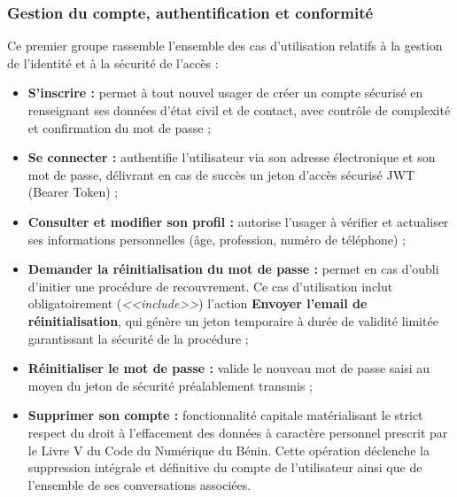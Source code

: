 \subsubsection{Gestion du compte, authentification et conformité}
Ce premier groupe rassemble l'ensemble des cas d'utilisation relatifs à la gestion de l'identité et à la sécurité de l'accès :
\begin{itemize}
    \item \textbf{S'inscrire :} permet à tout nouvel usager de créer un compte sécurisé en renseignant ses données d'état civil et de contact, avec contrôle de complexité et confirmation du mot de passe ;
    
    \item \textbf{Se connecter :} authentifie l'utilisateur via son adresse électronique et son mot de passe, délivrant en cas de succès un jeton d'accès sécurisé JWT (Bearer Token) ;
    
    \item \textbf{Consulter et modifier son profil :} autorise l'usager à vérifier et actualiser ses informations personnelles (âge, profession, numéro de téléphone) ;
    
    \item \textbf{Demander la réinitialisation du mot de passe :} permet en cas d'oubli d'initier une procédure de recouvrement. Ce cas d'utilisation inclut obligatoirement (\textit{<<include>>}) l'action \textbf{Envoyer l'email de réinitialisation}, qui génère un jeton temporaire à durée de validité limitée garantissant la sécurité de la procédure ;
    
    \item \textbf{Réinitialiser le mot de passe :} valide le nouveau mot de passe saisi au moyen du jeton de sécurité préalablement transmis ;
    
    \item \textbf{Supprimer son compte :} fonctionnalité capitale matérialisant le strict respect du droit à l'effacement des données à caractère personnel prescrit par le Livre V du Code du Numérique du Bénin. Cette opération déclenche la suppression intégrale et définitive du compte de l'utilisateur ainsi que de l'ensemble de ses conversations associées.
\end{itemize}

